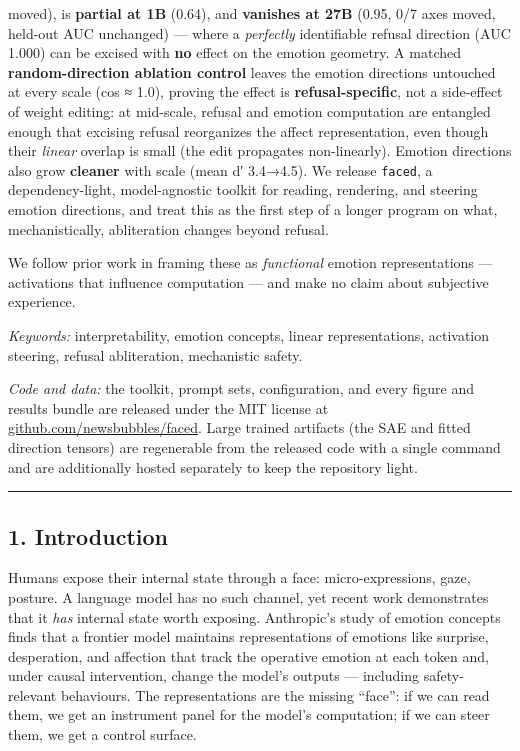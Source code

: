 \documentclass[
]{article}
\begin{document}
moved), is \textbf{partial at 1B} (0.64), and \textbf{vanishes at 27B}
(0.95, 0/7 axes moved, held-out AUC unchanged) --- where a
\emph{perfectly} identifiable refusal direction (AUC 1.000) can be
excised with \textbf{no} effect on the emotion geometry. A matched
\textbf{random-direction ablation control} leaves the emotion directions
untouched at every scale (cos ≈ 1.0), proving the effect is
\textbf{refusal-specific}, not a side-effect of weight editing: at
mid-scale, refusal and emotion computation are entangled enough that
excising refusal reorganizes the affect representation, even though
their \emph{linear} overlap is small (the edit propagates non-linearly).
Emotion directions also grow \textbf{cleaner} with scale (mean d′
3.4→4.5). We release \texttt{faced}, a dependency-light, model-agnostic
toolkit for reading, rendering, and steering emotion directions, and
treat this as the first step of a longer program on what,
mechanistically, abliteration changes beyond refusal.

We follow prior work in framing these as \emph{functional} emotion
representations --- activations that influence computation --- and make
no claim about subjective experience.

\emph{Keywords:} interpretability, emotion concepts, linear
representations, activation steering, refusal abliteration, mechanistic
safety.

\emph{Code and data:} the toolkit, prompt sets, configuration, and every
figure and results bundle are released under the MIT license at
\href{https://github.com/newsbubbles/faced}{github.com/newsbubbles/faced}.
Large trained artifacts (the SAE and fitted direction tensors) are
regenerable from the released code with a single command and are
additionally hosted separately to keep the repository light.

\begin{center}\rule{0.5\linewidth}{0.5pt}\end{center}

\subsection{1. Introduction}\label{introduction}

Humans expose their internal state through a face: micro-expressions,
gaze, posture. A language model has no such channel, yet recent work
demonstrates that it \emph{has} internal state worth exposing.
Anthropic's study of emotion concepts \citep{sofroniew2026emotion} finds
that a frontier model maintains representations of emotions like
surprise, desperation, and affection that track the operative emotion at
each token and, under causal intervention, change the model's outputs
--- including safety-relevant behaviours. The representations are the
missing ``face'': if we can read them, we get an instrument panel for
the model's computation; if we can steer them, we get a control surface.
\end{document}
